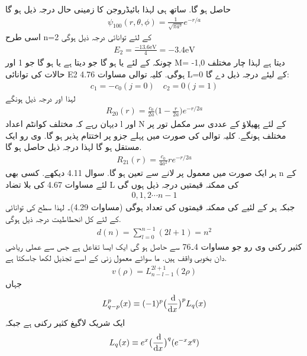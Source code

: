 حاصل ہو گا. ساتھ ہی
لہذا بائیڈروجن کا زمینی حال درجہ ذیل ہو گا
\begin{align}
\psi_{100}(r,\theta,\phi)=\frac{1}{\sqrt{\pi a^{3}}}e^{-r/a} 
\end{align}
اسی طرح n=2  کے لئے توانائی درجہ ذیل ہوگی
\begin{align}
E_{2}=\frac{-13.6\text{eV}}{4}=-3.4\text{eV} 
\end{align}
چونکہ
کے لئے یا 
ہو گا جو
دیتا ہے يا
ہو گا جو 1 اور M= -1,0 دیتا ہے لہذا چار مختلف حالات کی توانائی E2 ہوگی. کلیہ توالی مساوات 4.76  L=0 کے لیئے درجہ ذیل دے گا:
\begin{align}
c_{1}=-c_{0} (j=0) \quad c_{2}=0 (j=1) 
\end{align}
لہذا
اور درجہ ذیل ہونگے
 \begin{align}
R_{20}(r)=\frac{c_{0}}{2a}\big(1-\frac{r}{2a}\big)e^{-r/2a} 
\end{align}
دیہان رہے کہ مختلف کوانٹم اعداد l اور N کے لئے پھیلاؤ کے عددی سر
 مکمل تور پر مختلف ہونگے. کلیہ توالی
  کی صورت میں پہلے جزو پر اختتام پذیر ہو گا. وی رو ایک مستقل ہو گا لہذا درجہ ذیل حاصل ہو گا.
   \begin{align}
R_{21}(r)=\frac{c_{0}}{4a^{2}}re^{-r/2a} 
\end{align}
ہر ایک صورت میں معمول پر لانے سے
تعین ہو گا.
سوال 4.11 دیکھے. کسی بھی n کے لئے مساوات 4.67 کی بلا تضاد L کی ممکنہ قیمتیں درجہ ذیل ہوں گی 
\begin{align}
0,1,2\cdots n-1 
\end{align}
جبکہ ہر
کے لئیے 
 کی ممکنہ قیمتوں کی تعداد
 ہوگی (مساوات 4.29)۔ لہذا
  سطح کی توانائی کے لئے کل انحطاطيت درجہ ذیل ہوگی.
\begin{align}
d(n)=\sum_{l=0}^{n-1}(2l+1)=n^{2} 
\end{align}
كثير رکنی وی رو جو مساوات 4۔76 سے حاصل ہو گی ایک ایسا تفاعل ہے جس سے عملی ریاضی دان بخوبی واقف ہیں. ما سوائے معمول زنی کے اسے تجذيل لکھا جاسکتا ہے.
 \begin{align}
v(\rho)=L_{n-l-1}^{2l+1}(2\rho) 
\end{align}
 جہاں
  \begin{align}
L_{q-p}^{p}(x)\equiv(-1)^{p}\big(\frac{\dif}{\dif{x}}\big)^{p}L_{q}(x) 
\end{align} 
 ایک شریک لاگیغ  كثير رکنی ہے جبکہ 
\begin{align}
 L_{q}(x)\equiv e^{x}\big(\frac{\dif}{\dif{x}}\big)^{q}(e^{-x}x^{q}) 
\end{align}

